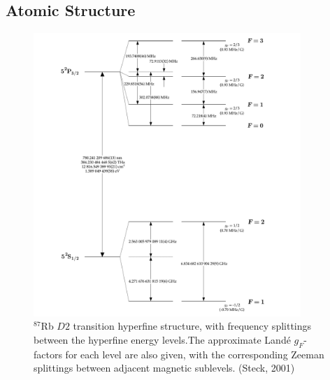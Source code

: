 \documentclass[10pt]{article}
\begin{document}
\subsection*{Atomic Structure}

\begin{figure}[h]
    \centering
    \includegraphics[width=0.9\textwidth]{img/rb87D2.png}
    \caption{$^87$Rb $D2$ transition hyperfine structure, with frequency splittings between the hyperfine energy levels.The approximate Landé
    $g_F$-factors for each level are also given, with the corresponding Zeeman splittings between adjacent magnetic sublevels. (Steck, 2001) }
    \label{fig:image1}
\end{figure}
\end{document}
